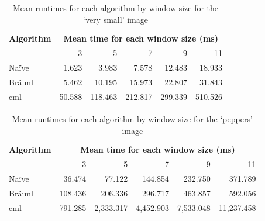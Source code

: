 \begin{table}
\centering
\caption[Mean runtimes for each algorithm for the `very small' image]{Mean runtimes for each algorithm by window size for the `very small' image}
\label{tab:median:verysmall}
\begin{tabular}{@{}lrrrrr@{}}
\toprule
\multicolumn{1}{c}{\textbf{Algorithm}} & \multicolumn{5}{c}{\textbf{Mean time for each window size (ms)}} \\
                              & 3        & 5         & 7         & 9         & 11       \\ \midrule
Naïve                         & 1.623    & 3.983     & 7.578     & 12.483    & 18.933   \\
Bräunl                        & 5.462    & 10.195    & 15.973    & 22.807    & 31.843   \\
\gls{cml}                           & 50.588   & 118.463   & 212.817   & 299.339   & 510.526  \\ \bottomrule
\end{tabular}
\end{table}

\begin{table}
\centering
\caption[Mean runtimes for each algorithm for the `peppers' image]{
\label{tab:median:peppers}Mean runtimes for each algorithm by window size for the `peppers' image}
\begin{tabular}{@{}lrrrrr@{}}
\toprule
\multicolumn{1}{c}{\textbf{Algorithm}} & \multicolumn{5}{c}{\textbf{Mean time for each window size (ms)}}  \\
                              & 3       & 5         & 7         & 9         & 11         \\ \midrule
Naïve                         & 36.474  & 77.122    & 144.854   & 232.750   & 371.789    \\
Bräunl                        & 108.436 & 206.336   & 296.717   & 463.857   & 592.056    \\
\gls{cml}                           & 791.285 & 2,333.317 & 4,452.903 & 7,533.048 & 11,237.458 \\ \bottomrule
\end{tabular}
\end{table}


